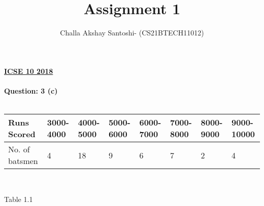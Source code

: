 \documentclass[12pt, a4paper] {article}
\title{Assignment 1}
\author{Challa Akshay Santoshi- (CS21BTECH11012)}
\begin{document}
\maketitle
\textbf{\underline{ICSE 10 2018}}\\\\

\textbf{Question: 3 (c)}\\\\
\setlength{\arrayrulewidth}{0.5mm}
\setlength{\tabcolsep}{18pt}
\renewcommand{\arraystretch}{1.5}
\begin{tabular}{ |p{2cm}|p{0.6cm}|p{0.6cm}|p{0.6cm}|p{0.6cm}|p{0.6cm}|p{0.6cm}|
p{0.6cm}|  }
\hline
Runs Scored & 3000-4000 & 4000-5000 & 5000-6000 & 6000-7000 & 7000-8000 & 8000-9000
& 9000-10000\\
\hline
No. of batsmen & 4 & 18 & 9 & 6 & 7 & 2 & 4 \\
\hline
\end{tabular}\\
\begin{center}
Table 1.1\\
\end{center} 
\end{document}
